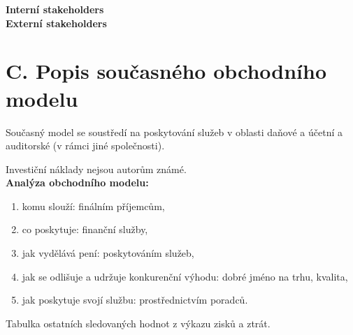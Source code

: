 \textbf{Interní stakeholders}\\

\textbf{Externí stakeholders}\\



\section*{C. Popis současného obchodního modelu}
\label{sec:Popis soucasneho obchodniho modelu}

Současný model se soustředí na poskytování služeb v oblasti daňové a účetní a auditorské (v rámci jiné společnosti).

Investiční náklady nejsou autorům známé.\\

\textbf{Analýza obchodního modelu:}

\begin{enumerate}
	\item komu slouží: finálním příjemcům,
	\item co poskytuje: finanční služby,
	\item jak vydělává pení: poskytováním služeb,
	\item jak se odlišuje a udržuje konkurenční výhodu: dobré jméno na trhu, kvalita,
	\item jak poskytuje svojí službu: prostřednictvím poradců.
\end{enumerate}

Tabulka ostatních sledovaných hodnot z výkazu zisků a ztrát.\\

